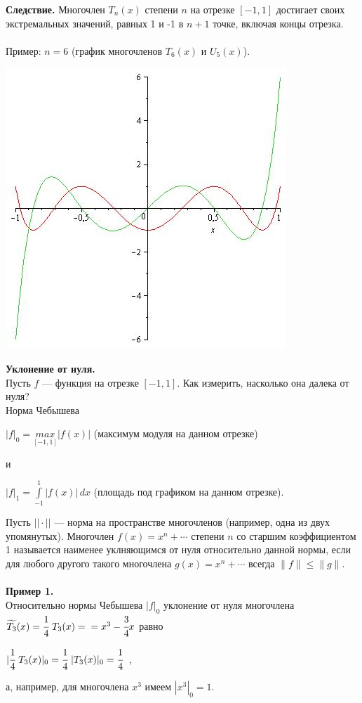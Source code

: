 \documentclass[12pt]{article}
\theoremstyle{definition}
\numberwithin{equation}{section}
\begin{document}
	\textbf{Следствие.}
	Многочлен $T_n(x)$ степени $n$ на отрезке $[-1, 1]$ достигает своих экстремальных значений, равных 1 и -1 в $n+1$ точке, включая концы отрезка.\\ \\
	Пример: $n=6$ (график многочленов $T_6(x)$ и $U_5(x)$).\begin{center}
		\includegraphics[scale=0.5]{T6U5.jpg} \end{center}
	\textbf{Уклонение от нуля.}\\
	Пусть $f$ --- функция на отрезке $[-1, 1]$. Как измерить, насколько она далека от нуля?\\
	Норма Чебышева \begin{center}$|f|_0=\underset{[-1, 1]}{max}|f(x)|$ (максимум модуля на данном отрезке)\end{center}
	и \begin{center}$|f|_1=\int\limits_{-1}^1 |f(x)|\,dx$ (площадь под графиком на данном отрезке).\end{center}
	Пусть $|| \cdot ||$ --- норма на пространстве многочленов (например, одна из двух упомянутых). Многочлен $f(x)=x^n+\cdots$ степени $n$ со старшим коэффициентом 1 называется наименее уклняющимся от нуля относительно данной нормы, если для любого другого такого многочлена $g(x)=x^n+\cdots$ всегда $\parallel f \parallel \leqslant \parallel g \parallel$.\\
	\\
	\textbf{Пример 1.}\\
	Относительно нормы Чебышева $|f|_0$ уклонение от нуля многочлена $\widetilde{T_3}(x)=\cfrac{1}{4}~T_3(x)=\\=x^3-\cfrac{3}{4}x$ равно\begin{center} $|\cfrac{1}{4}~T_3(x)|_0=\cfrac{1}{4}~|T_3(x)|_0=\cfrac{1}{4}$~,\end{center} а, например, для многочлена $x^3$ имеем $|x^3|_0=1$.\\ \\
\end{document}
